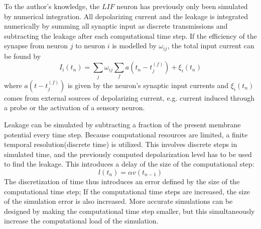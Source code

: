 	To the author's knowledge, the $LIF$ neuron has previously only been simulated by numerical integration.
	All depolarizing current and the leakage is integrated numerically by summing all synaptic input as discrete transmissions and subtracting the leakage after each computational time step.
	If the efficiency of the synapse from neuron $j$ to neuron $i$ is modelled by $\omega_{ij}$, the total input current can be found by 
\begin{equation}
	I_i(t_n) = \sum_j \omega_{ij} \sum_f a(t_n - t_j^{(f)}) + \xi_i(t_n)
\end{equation}
	where $a(t- t_j^{(f)})$ is given by the neuron's synaptic input currents and $\xi_i(t_n)$ comes from external sources of depolarizing current, e.g. current induced through a probe or the activation of a sensory neuron\cite{florian03}.

	Leakage can be simulated by subtracting a fraction of the present membrane potential every time step.
	Because computational resources are limited, a finite temporal resolution(discrete time) is utilized.
	This involves discrete steps in simulated time, and the previously computed depolarization level has to be used to find the leakage.
	This introduces a delay of the size of the computational step:
\begin{equation}
	l(t_n) = \alpha v(t_{n-1})
\end{equation}
	The discretization of time thus introduces an error defined by the size of the computational time step;
		If the computational time steps are increased, the size of the simulation error is also increased.
	More accurate simulations can be designed by making the computational time step smaller, but this simultaneously increase the computational load of the simulation. %
	
